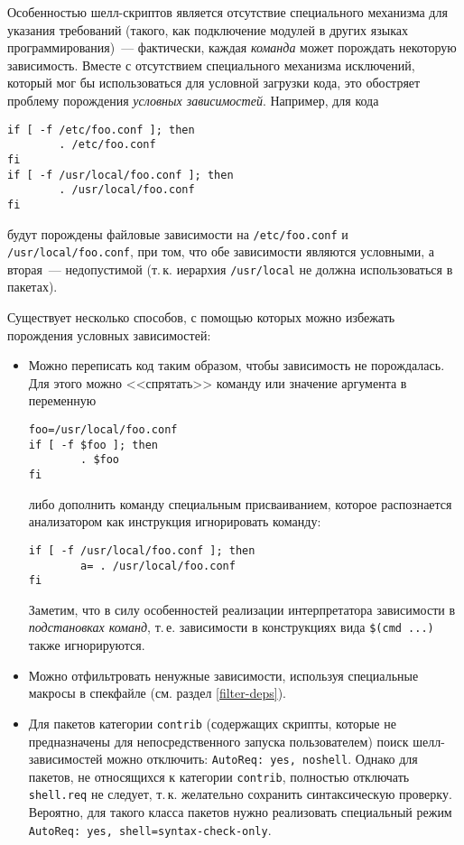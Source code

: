 \documentclass[russian,a4paper,12pt,titlepage]{article}
\begin{document}
Особенностью шелл-скриптов является отсутствие специального механизма для указания требований (такого, как подключение
модулей в других языках программирования)~--- фактически, каждая \textit{команда} может порождать некоторую зависимость.
Вместе с отсутствием специального механизма исключений, который мог бы использоваться для условной загрузки кода,
это обостряет проблему порождения \textit{условных зависимостей}.  Например, для кода
\begin{verbatim}
if [ -f /etc/foo.conf ]; then
        . /etc/foo.conf
fi
if [ -f /usr/local/foo.conf ]; then
        . /usr/local/foo.conf
fi
\end{verbatim}
будут порождены файловые зависимости на \verb|/etc/foo.conf| и \verb|/usr/local/foo.conf|, при том,
что обе зависимости являются условными, а вторая~--- недопустимой (т.\,к. иерархия \verb|/usr/local|
не должна использоваться в пакетах).

Существует несколько способов, с помощью которых можно избежать порождения условных зависимостей:
\begin{itemize}
\item Можно переписать код таким образом, чтобы зависимость не порождалась.
Для этого можно <<спрятать>> команду или значение аргумента в переменную
\begin{verbatim}
foo=/usr/local/foo.conf
if [ -f $foo ]; then
        . $foo
fi
\end{verbatim}
либо дополнить команду специальным присваиванием, которое распознается анализатором
как инструкция игнорировать команду:
\begin{verbatim}
if [ -f /usr/local/foo.conf ]; then
        a= . /usr/local/foo.conf
fi
\end{verbatim}
Заметим, что в силу особенностей реализации интерпретатора зависимости в \textit{подстановках команд},
т.\,е. зависимости в конструкциях вида \verb|$(cmd ...)| также игнорируются.
\item Можно отфильтровать ненужные зависимости, используя специальные макросы в спекфайле
(см. раздел \ref{filter-deps}).
\item Для пакетов категории \verb|contrib| (содержащих скрипты, которые не предназначены для
непосредственного запуска пользователем) поиск шелл-зависимостей можно отключить:
\texttt{AutoReq: yes, noshell}.  Однако для пакетов, не относящихся к категории \verb|contrib|,
полностью отключать \verb|shell.req| не следует, т.\,к. желательно сохранить синтаксическую
проверку.  Вероятно, для такого класса пакетов нужно реализовать специальный режим
\texttt{AutoReq: yes, shell=syntax-check-only}.
\end{itemize}
\end{document}
